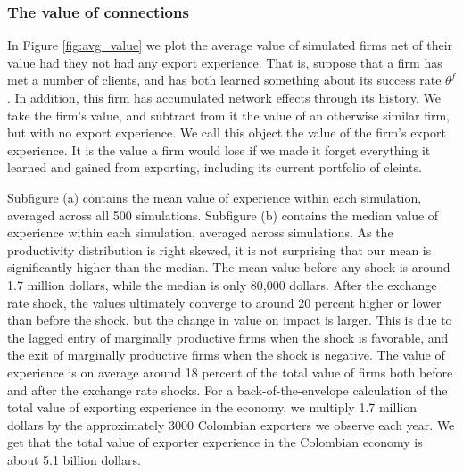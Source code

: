 \documentclass[12pt]{article}
\begin{document}
\subsubsection{The value of connections }

In Figure \ref{fig:avg_value} we plot the average value of simulated firms
net of their value had they not had any export experience. That is, suppose
that a firm has met a number of clients, and has both learned something
about its success rate $\theta ^{f}$. In addition, this firm has accumulated
network effects through its history. We take the firm's value, and subtract
from it the value of an otherwise similar firm, but with no export
experience. We call this object the value of the firm's export experience.
It is the value a firm would lose if we made it forget everything it learned
and gained from exporting, including its current portfolio of cleints.

Subfigure (a) contains the mean value of experience within each simulation,
averaged across all 500 simulations. Subfigure (b) contains the median value
of experience within each simulation, averaged across simulations. As the
productivity distribution is right skewed, it is not surprising that our
mean is significantly higher than the median. The mean value before any
shock is around 1.7 million dollars, while the median is only 80,000
dollars. After the exchange rate shock, the values ultimately converge to
around 20 percent higher or lower than before the shock, but the change in
value on impact is larger. This is due to the lagged entry of marginally
productive firms when the shock is favorable, and the exit of marginally
productive firms when the shock is negative. The value of experience is on
average around 18 percent of the total value of firms both before and after
the exchange rate shocks. For a back-of-the-envelope calculation of the
total value of exporting experience in the economy, we multiply 1.7 million
dollars by the approximately 3000 Colombian exporters we observe each year.
We get that the total value of exporter experience in the Colombian economy
is about 5.1 billion dollars.
\end{document}
